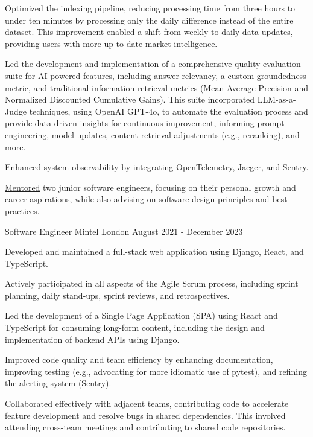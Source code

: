 \documentclass[11pt, a4paper]{awesome-cv}
\begin{document}
\begin{cventries}
{\begin{cvitems}
        \item {Optimized the indexing pipeline, reducing processing time from three hours to under ten minutes by processing only the daily difference instead of the entire dataset. This improvement enabled a shift from weekly to daily data updates, providing users with more up-to-date market intelligence.}
        \item {Led the development and implementation of a comprehensive quality evaluation suite for AI-powered features, including answer relevancy, a \href{https://leverstone.me/blog/automating-groundedness-evaluation-in-rag-applications}{custom groundedness metric}, and traditional information retrieval metrics (Mean Average Precision and Normalized Discounted Cumulative Gains). This suite incorporated LLM-as-a-Judge techniques, using OpenAI GPT-4o, to automate the evaluation process and provide data-driven insights for continuous improvement, informing prompt engineering, model updates, content retrieval adjustments (e.g., reranking), and more.}
        \item {Enhanced system observability by integrating OpenTelemetry, Jaeger, and Sentry.}
        \item {\href{https://leverstone.me/blog/mentoring-toolkit}{Mentored} two junior software engineers, focusing on their personal growth and career aspirations, while also advising on software design principles and best practices.}
      \end{cvitems}
    }

  \cventry
    {Software Engineer}
    {Mintel}
    {London}
    {August 2021 - December 2023}
    {
      \begin{cvitems}
        \item {Developed and maintained a full-stack web application using Django, React, and TypeScript.}
        \item {Actively participated in all aspects of the Agile Scrum process, including sprint planning, daily stand-ups, sprint reviews, and retrospectives.}
        \item {Led the development of a Single Page Application (SPA) using React and TypeScript for consuming long-form content, including the design and implementation of backend APIs using Django.}
        \item {Improved code quality and team efficiency by enhancing documentation, improving testing (e.g., advocating for more idiomatic use of pytest), and refining the alerting system (Sentry).}
        \item {Collaborated effectively with adjacent teams, contributing code to accelerate feature development and resolve bugs in shared dependencies. This involved attending cross-team meetings and contributing to shared code repositories.}
      \end{cvitems}
    }


\end{cventries}
\end{document}
